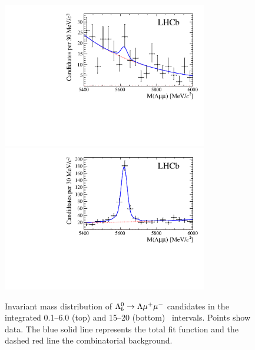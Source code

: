 \begin{figure}
\centering
\includegraphics[width=0.8\textwidth]{Lmumu/figs/paper/figure13.pdf}
\includegraphics[width=0.8\textwidth]{Lmumu/figs/paper/figure2.pdf}
\caption{Invariant mass distribution of $\Lambda^0_b\rightarrow\Lambda\mu^+\mu^-$ candidates in the integrated 0.1--6.0 \gevgevcccc(top)
and 15--20 \gevgevcccc (bottom) ~\qsq intervals. Points show data.
The blue solid line represents the total fit function and the dashed red line the combinatorial background.}
\label{fig:Lb_Lmumu}
\end{figure}
